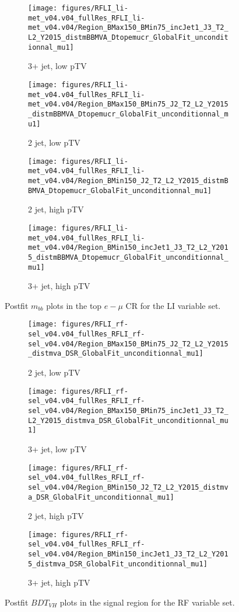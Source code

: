 \begin{figure}[!htbp]\captionsetup{justification=centering}
    \centering
\begin{subfigure}[t]{0.45000\textwidth}\centering\texttt{[image: figures/RFLI\_li-met\_v04.v04\_fullRes\_RFLI\_li-met\_v04.v04/Region\_BMax150\_BMin75\_incJet1\_J3\_T2\_L2\_Y2015\_distmBBMVA\_Dtopemucr\_GlobalFit\_unconditionnal\_mu1]}\caption{3+ jet, low pTV}\end{subfigure}
\begin{subfigure}[t]{0.45000\textwidth}\centering\texttt{[image: figures/RFLI\_li-met\_v04.v04\_fullRes\_RFLI\_li-met\_v04.v04/Region\_BMax150\_BMin75\_J2\_T2\_L2\_Y2015\_distmBBMVA\_Dtopemucr\_GlobalFit\_unconditionnal\_mu1]}\caption{2 jet, low pTV}\end{subfigure}
\begin{subfigure}[t]{0.45000\textwidth}\centering\texttt{[image: figures/RFLI\_li-met\_v04.v04\_fullRes\_RFLI\_li-met\_v04.v04/Region\_BMin150\_J2\_T2\_L2\_Y2015\_distmBBMVA\_Dtopemucr\_GlobalFit\_unconditionnal\_mu1]}\caption{2 jet, high pTV}\end{subfigure}
\begin{subfigure}[t]{0.45000\textwidth}\centering\texttt{[image: figures/RFLI\_li-met\_v04.v04\_fullRes\_RFLI\_li-met\_v04.v04/Region\_BMin150\_incJet1\_J3\_T2\_L2\_Y2015\_distmBBMVA\_Dtopemucr\_GlobalFit\_unconditionnal\_mu1]}\caption{3+ jet, high pTV}\end{subfigure}
  \caption{Postfit $m_{bb}$ plots in the top $e-\mu$ CR for the LI variable set.}
  \label{fig:LIPostfittopemu}
\end{figure}

\begin{figure}[!htbp]\captionsetup{justification=centering}
    \centering
\begin{subfigure}[t]{0.45000\textwidth}\centering\texttt{[image: figures/RFLI\_rf-sel\_v04.v04\_fullRes\_RFLI\_rf-sel\_v04.v04/Region\_BMax150\_BMin75\_J2\_T2\_L2\_Y2015\_distmva\_DSR\_GlobalFit\_unconditionnal\_mu1]}\caption{2 jet, low pTV}\end{subfigure}
\begin{subfigure}[t]{0.45000\textwidth}\centering\texttt{[image: figures/RFLI\_rf-sel\_v04.v04\_fullRes\_RFLI\_rf-sel\_v04.v04/Region\_BMax150\_BMin75\_incJet1\_J3\_T2\_L2\_Y2015\_distmva\_DSR\_GlobalFit\_unconditionnal\_mu1]}\caption{3+ jet, low pTV}\end{subfigure}
\begin{subfigure}[t]{0.45000\textwidth}\centering\texttt{[image: figures/RFLI\_rf-sel\_v04.v04\_fullRes\_RFLI\_rf-sel\_v04.v04/Region\_BMin150\_J2\_T2\_L2\_Y2015\_distmva\_DSR\_GlobalFit\_unconditionnal\_mu1]}\caption{2 jet, high pTV}\end{subfigure}
\begin{subfigure}[t]{0.45000\textwidth}\centering\texttt{[image: figures/RFLI\_rf-sel\_v04.v04\_fullRes\_RFLI\_rf-sel\_v04.v04/Region\_BMin150\_incJet1\_J3\_T2\_L2\_Y2015\_distmva\_DSR\_GlobalFit\_unconditionnal\_mu1]}\caption{3+ jet, high pTV}\end{subfigure}
  \caption{Postfit $BDT_{VH}$ plots in the signal region for the RF variable set.}
  \label{fig:RFPostfitmva}
\end{figure}

